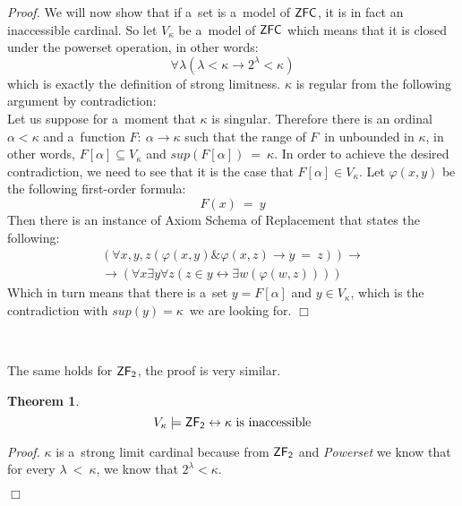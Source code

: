 \documentclass[12pt,a4paper]{article}
\newtheorem{theorem}{Theorem}[section]
\newenvironment{proof}
{\noindent \textit{Proof.}}
{\hspace*{\fill} $\Box$}
\renewcommand{\iff}{\leftrightarrow}
\newcommand{\then}{\rightarrow}
\begin{document}
\begin{}
\begin{proof}
We will now show that if a~set is a~model of $\sf{ZFC}$, it is in fact an inaccessible cardinal. So let $V_\kappa$ be a~model of $\sf{ZFC}$ which means that it is closed under the powerset operation, in other words:
\begin{equation}
\forall \lambda (\lambda < \kappa \then 2^{\lambda} < \kappa)
\end{equation}
which is exactly the definition of strong limitness. $\kappa$ is regular from the following argument by contradiction:\\
Let us suppose for a~moment that $\kappa$ is singular. Therefore there is an ordinal $\alpha < \kappa$ and a~function $F:\ \alpha \then \kappa$ such that the range of $F$ in unbounded in $\kappa$, in other words, $F[\alpha] \subseteq V_\kappa$ and $sup(F[\alpha])\ =\ \kappa$. In order to achieve the desired contradiction, we need to see that it is the case that $F[\alpha] \in V_\kappa$. Let $\varphi(x, y)$ be the following first-order formula: %
\begin{equation}
F(x)\ =\ y
\end{equation}
Then there is an instance of  Axiom Schema of Replacement that states the following:
\begin{equation}
\begin{gathered}
(\forall x, y, z(\varphi(x, y) \& \varphi(x, z) \then y\ =\ z)) \then \\
\then (\forall x \exists y \forall z (z \in y \iff \exists w (\varphi(w, z))))
\end{gathered}
\end{equation}
Which in turn means that there is a~set $y = F[\alpha]$ and $y \in V_\kappa$, which is the contradiction with $sup(y) = \kappa$ we are looking for.
\end{proof}

\

The same holds for $\sf{ZF}_2$, the proof is very similar.
\begin{theorem}\label{theorem:inaccessible_models_zfc_2}
\begin{equation}
V_\kappa \models \sf{ZF}_2 \iff \mbox{$\kappa$ is inaccessible}
\end{equation}
\end{theorem}
\begin{proof}
$\kappa$ is a~strong limit cardinal because from $\sf{ZF}_2$ and \emph{Powerset} we know that for every $\lambda\ <\ \kappa$, we know that $2^{\lambda} < \kappa$.


\end{proof}
\end{}
\end{document}
